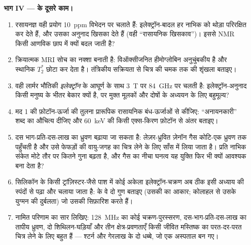 \begin{problem}
\medskip\noindent\textbf{भाग IV ---  के दूसरे काम।}
\begin{enumerate}[resume]
  \item रसायनज्ञ वही प्रयोग \qty{10}{ppm} विभेदन पर चलाते हैं:
        इलेक्ट्रॉन-बादल हर नाभिक को थोड़ा परिरक्षित कर देते हैं, और
        उसका अनुनाद खिसका देते हैं (वही ``रासायनिक खिसकाव'')। इससे
        NMR किसी आणविक छाप में क्यों बदल जाती है?
  \item क्रियात्मक MRI सोच का नक्शा बनाती है: विऑक्सीजनित हीमोग्लोबिन
        अनुचुंबकीय है और स्थानिक $T_2^*$ छोटा कर देता है। तंत्रिकीय
        सक्रियता से चित्र की चमक तक की शृंखला बताइए।
  \item वही लार्मर भौतिकी \emph{इलेक्ट्रॉन} के आघूर्ण के साथ
        \qty{3}{T} पर \qty{84}{GHz} पर चलती है: इलेक्ट्रॉन-अनुनाद
        किसी मनुष्य के भीतर बेकार क्यों है, पर मुक्त मूलकों और
        दोषों के अध्ययन के लिए बहुमूल्य?
  \item मद 1 की फ़ोटॉन-ऊर्जा की तुलना प्रारूपिक रासायनिक
        बंध-ऊर्जाओं से कीजिए: ``अनायनकारी'' शब्द का औचित्य दीजिए और
        \qty{60}{keV} की किसी एक्स-किरण फ़ोटॉन से अंतर बताइए।
  \item दस भाग-प्रति-दस-लाख का ध्रुवण बढ़ाया जा सकता है: लेज़र-ध्रुवित
        ज़ेनॉन गैस कोटि-एक ध्रुवण तक पहुँचती है और उसे फेफड़ों की
        वायु-जगह का चित्र लेने के लिए साँस में लिया जाता है। प्रति
        नाभिक संकेत मोटे तौर पर कितने गुना बढ़ता है, और गैस का नीचा
        घनत्व यह युक्ति फिर भी क्यों आवश्यक बना देता है?
  \item सिलिकॉन के किसी ट्रांज़िस्टर-जैसे पाश में कोई अकेला
        इलेक्ट्रॉन-चक्रण अब ठीक इसी अध्याय की स्पंदों से पढ़ा और चलाया
        जाता है:  के वे दो गुण बताइए (उसकी
         का आकार; कोलाहल से उसके युग्मन की दुर्बलता)
        जो उसकी सिफ़ारिश करते हैं।
  \item नामित परिणाम का सार लिखिए: \qty{128}{MHz} का कोई
        चक्रण-पुरस्सरण, दस-भाग-प्रति-दस-लाख का तापीय ध्रुवण,
        दो शिथिलन-घड़ियाँ और तीन क्षेत्र-प्रवणताएँ किसी जीवित मस्तिष्क
        का परत-दर-परत चित्र लेने के लिए बहुत हैं --- श्टर्न और
        गेरलाख के दो धब्बे, जो एक अस्पताल बन गए।
\end{enumerate}
\end{problem}
